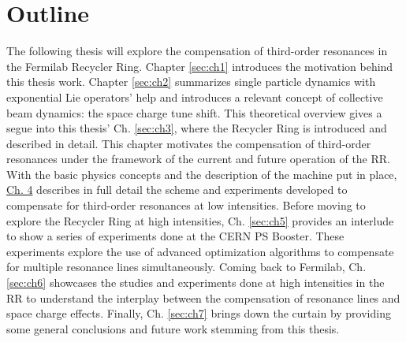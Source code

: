 \section{Outline}

The following thesis will explore the compensation of third-order resonances in the Fermilab Recycler Ring. Chapter \ref{sec:ch1} introduces the motivation behind this thesis work. Chapter \ref{sec:ch2} summarizes single particle dynamics with exponential Lie operators' help and introduces a relevant concept of collective beam dynamics: the space charge tune shift. This theoretical overview gives a segue into this thesis' Ch. \ref{sec:ch3}, where the Recycler Ring is introduced and described in detail. This chapter motivates the compensation of third-order resonances under the framework of the current and future operation of the RR. With the basic physics concepts and the description of the machine put in place, \hyperref[sec:ch4]{Ch. 4} describes in full detail the scheme and experiments developed to compensate for third-order resonances at low intensities. Before moving to explore the Recycler Ring at high intensities, Ch. \ref{sec:ch5} provides an interlude to show a series of experiments done at the CERN PS Booster. These experiments explore the use of advanced optimization algorithms to compensate for multiple resonance lines simultaneously. Coming back to Fermilab, Ch. \ref{sec:ch6} showcases the studies and experiments done at high intensities in the RR to understand the interplay between the compensation of resonance lines and space charge effects. Finally, Ch. \ref{sec:ch7} brings down the curtain by providing some general conclusions and future work stemming from this thesis.